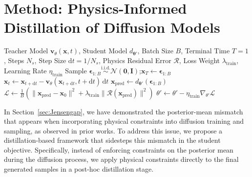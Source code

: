 \documentclass{article}
\theoremstyle{plain}
\theoremstyle{definition}
\theoremstyle{remark}
\def\cN{{\mathcal{N}}}
\def\vv{{\bm{v}}}
\def\vx{{\bm{x}}}
\begin{document}
\section{Method: Physics-Informed Distillation of Diffusion Models}
\begin{algorithm}[t]
\caption{PIDDM Training: Physics-Informed Distillation.}\label{alg:piddm_training}
\begin{algorithmic}[1]
\Require Teacher Model $\vv_{\theta}(\vx,t)$, Student Model $d_{\boldsymbol{\theta}'}$, Batch Size $B$, Terminal Time $T{=}1$, Steps $N_s$, Step Size $\mathrm{d}t{=}1/N_s$, Physics Residual Error $\mathcal R$, Loss Weight $\lambda_{\text{train}}$, Learning Rate $\eta_{\text{train}}$
\Repeat
  \State Sample $\boldsymbol{\epsilon}_{1:B}\stackrel{\text{i.i.d.}}{\sim}\cN(\mathbf 0,\mathbf I)$;\quad $\vx_T\leftarrow\boldsymbol{\epsilon}_{1:B}$
    \State $\vx_t\leftarrow\vx_{t{+}\mathrm{d}t}-\vv_{\theta}(\vx_{t{+}\mathrm{d}t},t{+}\mathrm{d}t)\,\mathrm{d}t$ 
  \EndFor
  \State $\vx_{\text{pred}}\leftarrow d_{\boldsymbol{\theta}'}(\boldsymbol{\epsilon}_{1:B})$
  \State $\mathcal L\leftarrow\tfrac1B(\bigl\|\vx_{\text{pred}}-\vx_0\bigr\|^2+\lambda_{\text{train}}\bigl\|\mathcal R(\vx_{\text{pred}})\bigr\|^2)$ 
  \State $\theta'\leftarrow\theta'-\eta_{\text{train}}\nabla_{\theta'}\mathcal L$
\end{algorithmic}
\end{algorithm}


In Section~\ref{sec:Jensengap}, we have demonstrated the posterior-mean mismatch that appears when incorporating physical constraints into diffusion training and sampling, as observed in prior works. To address this issue, we propose a distillation-based framework that sidesteps this mismatch in the student objective. Specifically, instead of enforcing constraints on the posterior mean during the diffusion process, we apply physical constraints directly to the final generated samples in a post-hoc distillation stage.
\end{document}

